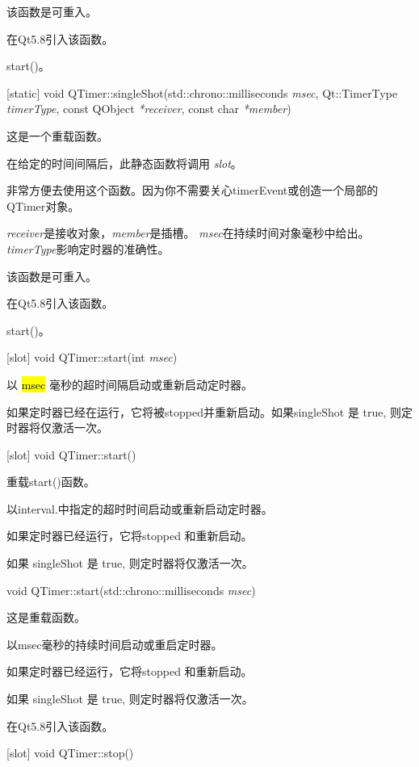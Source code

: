 \begin{notice}
该函数是可重入。
\end{notice}

在Qt5.8引入该函数。

\begin{seeAlso}
start()。
\end{seeAlso}

[static] void QTimer::singleShot(std::chrono::milliseconds \emph{msec}, Qt::TimerType \emph{timerType}, const QObject \emph{*receiver}, const char \emph{*member})

这是一个重载函数。

在给定的时间间隔后，此静态函数将调用 \emph{slot}。

非常方便去使用这个函数。因为你不需要关心timerEvent或创造一个局部的QTimer对象。

\emph{receiver}是接收对象，\emph{member}是插槽。 \emph{msec}在持续时间对象毫秒中给出。 \emph{timerType}影响定时器的准确性。

\begin{notice}
该函数是可重入。
\end{notice}

在Qt5.8引入该函数。

\begin{seeAlso}
start()。
\end{seeAlso}

[slot] void QTimer::start(int \emph{msec})

以 \hl{msec} 毫秒的超时间隔启动或重新启动定时器。

如果定时器已经在运行，它将被stopped并重新启动。如果singleShot 是 true, 则定时器将仅激活一次。

[slot] void QTimer::start()

重载start()函数。

以interval.中指定的超时时间启动或重新启动定时器。

如果定时器已经运行，它将stopped 和重新启动。

如果 singleShot 是 true, 则定时器将仅激活一次。

void QTimer::start(std::chrono::milliseconds \emph{msec})

这是重载函数。

以msec毫秒的持续时间启动或重启定时器。

如果定时器已经运行，它将stopped 和重新启动。

如果 singleShot 是 true, 则定时器将仅激活一次。

在Qt5.8引入该函数。

[slot] void QTimer::stop()

